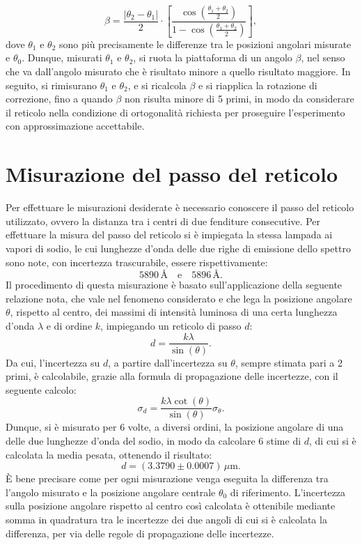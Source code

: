 \documentclass[a4paper,12pt]{article}
\begin{document}
\[
\beta = \frac{|\theta_2 - \theta_1|}{2} \cdot \left[ \frac{\cos\left(\frac{\theta_1 + \theta_2}{2}\right)}{1 - \cos\left(\frac{\theta_1 + \theta_2}{2}\right)} \right],
\]
dove \( \theta_1 \) e \( \theta_2 \) sono più precisamente le differenze tra le posizioni angolari misurate e \( \theta_0 \).
Dunque, misurati \( \theta_1 \) e \( \theta_2 \), si ruota la piattaforma di un angolo \( \beta \), nel senso che va dall’angolo misurato che è risultato minore a quello risultato maggiore. In seguito, si rimisurano \( \theta_1 \) e \( \theta_2 \), e si ricalcola \( \beta \) e si riapplica la rotazione di correzione, fino a quando \( \beta \) non risulta minore di 5 primi, in modo da considerare il reticolo nella condizione di ortogonalità richiesta per proseguire l’esperimento con approssimazione accettabile.

\section{Misurazione del passo del reticolo}
Per effettuare le misurazioni desiderate è necessario conoscere il passo del reticolo utilizzato, ovvero la distanza tra i centri di due fenditure consecutive.
Per effettuare la misura del passo del reticolo si è impiegata la stessa lampada ai vapori di sodio, le cui lunghezze d’onda delle due righe di emissione dello spettro sono note, con incertezza trascurabile, essere rispettivamente:
\[
5890 \, \text{\AA} \quad \text{e} \quad 5896 \, \text{\AA}.
\]
Il procedimento di questa misurazione è basato sull’applicazione della seguente relazione nota, che vale nel fenomeno considerato e che lega la posizione angolare \( \theta \), rispetto al centro, dei massimi di intensità luminosa di una certa lunghezza d’onda \( \lambda \) e di ordine \( k \), impiegando un reticolo di passo \( d \):
\[
d = \frac{k\lambda}{\sin(\theta)}.
\]
Da cui, l’incertezza su \( d \), a partire dall’incertezza su \( \theta \), sempre stimata pari a 2 primi, è calcolabile, grazie alla formula di propagazione delle incertezze, con il seguente calcolo:
\[
\sigma_d = \frac{k\lambda \cot(\theta)}{\sin(\theta)} \sigma_\theta.
\]
Dunque, si è misurato per 6 volte, a diversi ordini, la posizione angolare di una delle due lunghezze d’onda del sodio, in modo da calcolare 6 stime di \( d \), di cui si è calcolata la media pesata, ottenendo il risultato:
\[
d = (3.3790 \pm 0.0007) \, \mu\text{m}.
\]
È bene precisare come per ogni misurazione venga eseguita la differenza tra l’angolo misurato e la posizione angolare centrale \( \theta_0 \) di riferimento. L’incertezza sulla posizione angolare rispetto al centro così calcolata è ottenibile mediante somma in quadratura tra le incertezze dei due angoli di cui si è calcolata la differenza, per via delle regole di propagazione delle incertezze.
\end{document}
